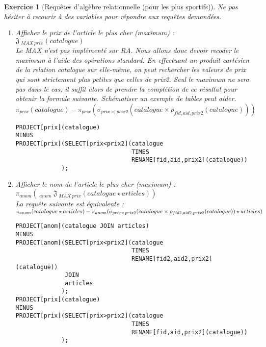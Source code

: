 \documentclass{article}
\theoremstyle{exostyle}
\newtheorem{exercice}{Exercice}
\newenvironment{questions}{

\begin{enumerate}[\hspace{12pt}\bfseries\itshape 1.]}{
\end{enumerate}

} %
\begin{document}

\noindent\hrulefill
\vspace{0.5cm}


\begin{exercice}[Requêtes d'algèbre relationnelle (pour les plus sportifs)]

Ne pas hésiter à recourir à des variables pour répondre aux requêtes demandées.

\begin{questions}

\item Afficher le prix de l'article le plus cher (maximum) :\\
$\mathfrak{J}\ _{MAX\ prix}(catalogue)$\\
Le MAX n'est pas implémenté sur RA. Nous allons donc devoir recoder le maximum à l'aide des opérations standard. En effectuant un produit cartésien de la relation catalogue sur elle-même, on peut rechercher les valeurs de prix qui sont strictement plus petites que celles de prix2. Seul le maximum ne sera pas dans le cas, il suffit alors de prendre la complétion de ce résultat pour obtenir la formule suivante. Schématiser un exemple de tables peut aider.\\
$\pi_{prix}(catalogue) - \pi_{prix}(\sigma_{prix<prix2}(catalogue
\times \rho_{fid,aid,prix2}(catalogue)))$
\begin{verbatim}
PROJECT[prix](catalogue)
MINUS
PROJECT[prix](SELECT[prix<prix2](catalogue
                                 TIMES
                                 RENAME[fid,aid,prix2](catalogue))
             );
\end{verbatim}

\item Afficher le nom de l'article le plus cher (maximum) :\\
$\pi_{anom}(\ _{anom}\ \mathfrak{J}\ _{MAX\ prix}(catalogue \star articles))$\\
La requête suivante est équivalente :\\
$\pi_{anom}(catalogue \star articles) -\newline \pi_{anom}(\sigma_{prix<prix2}(catalogue
\times \rho_{fid2,aid2,prix2}(catalogue)) \star articles)$
\begin{verbatim}
PROJECT[anom](catalogue JOIN articles)
MINUS
PROJECT[anom](SELECT[prix<prix2](catalogue
                                 TIMES
                                 RENAME[fid2,aid2,prix2](catalogue))
              JOIN
              articles
             );
PROJECT[prix](catalogue)
MINUS
PROJECT[prix](SELECT[prix>prix2](catalogue
                                 TIMES
                                 RENAME[fid,aid,prix2](catalogue))
             );
\end{verbatim}


\end{questions}
\end{exercice}
\end{document}
